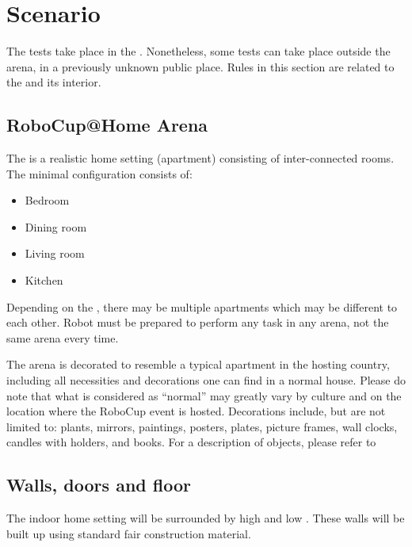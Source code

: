 \section{Scenario}
\label{sec:scenario}

The tests take place in the . Nonetheless, some tests can take place outside the arena, in a previously unknown public place. Rules in this section are related to the  and its interior.

\subsection{RoboCup@Home Arena}
The  is a realistic home setting (apartment) consisting of inter-connected rooms.
The minimal configuration consists of:
\begin{itemize}
	\item Bedroom
	\item Dining room
	\item Living room
	\item Kitchen
\end{itemize}
Depending on the , there may be multiple apartments which may be different to each other.
Robot must be prepared to perform any task in any arena, not the same arena every time.

The arena is decorated to resemble a typical apartment in the hosting country, including all necessities and decorations one can find in a normal house.
Please do note that what is considered as \enquote{normal} may greatly vary by culture and on the location where the RoboCup event is hosted.
Decorations include, but are not limited to: plants, mirrors, paintings, posters, plates, picture frames, wall clocks, candles with holders, and books.
For a description of objects, please refer to 

\subsection{Walls, doors and floor}
\label{rule:scenario_walls}

The indoor home setting will be surrounded by high and low .
These walls will be built up using standard fair construction material.

